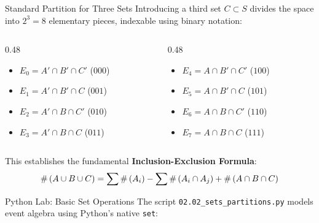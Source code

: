 \documentclass[10pt,aspectratio=169]{beamer}
\begin{document}
\begin{frame}{Standard Partition for Three Sets}
  Introducing a third set $C \subset S$ divides the space into $2^3 = 8$ elementary pieces, indexable using binary notation:
  
  \vspace{0.2em}
  \begin{columns}[T]
    \begin{column}{0.48\textwidth}
      \small
      \begin{itemize}
        \item $E_0 = A' \cap B' \cap C'$ \quad ($000$)
        \item $E_1 = A' \cap B' \cap C$ \quad ($001$)
        \item $E_2 = A' \cap B \cap C'$ \quad ($010$)
        \item $E_3 = A' \cap B \cap C$ \quad ($011$)
      \end{itemize}
    \end{column}
    \begin{column}{0.48\textwidth}
      \small
      \begin{itemize}
        \item $E_4 = A \cap B' \cap C'$ \quad ($100$)
        \item $E_5 = A \cap B' \cap C$ \quad ($101$)
        \item $E_6 = A \cap B \cap C'$ \quad ($110$)
        \item $E_7 = A \cap B \cap C$ \quad ($111$)
      \end{itemize}
    \end{column}
  \end{columns}
  
  \vspace{0.3em}
  \pause
  \begin{center}
    \small This establishes the fundamental \textbf{Inclusion-Exclusion Formula}:
    \[ \#\left( A \cup B \cup C \right) = \sum \#\left( A_i \right) - \sum \#\left( A_i \cap A_j \right) + \#\left( A \cap B \cap C \right) \]
  \end{center}
\end{frame}

\begin{frame}[fragile]{Python Lab: Basic Set Operations}
  The script \texttt{02.02\_sets\_partitions.py} models event algebra using Python's native \texttt{set}:
  \vspace{0.2em}
  {
  }
\end{frame}
\end{document}
